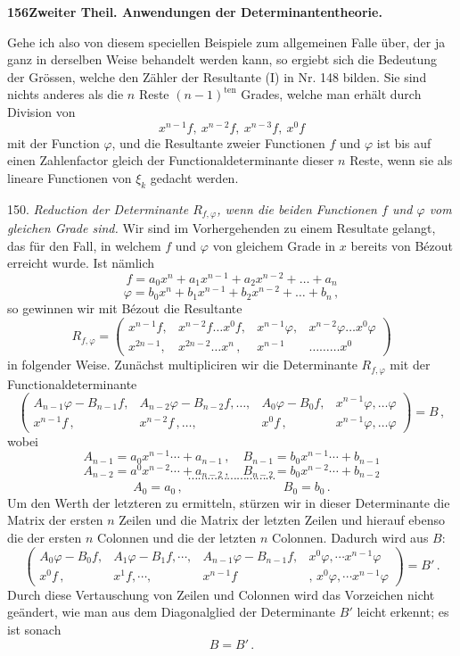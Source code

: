 \documentclass[11pt]{article}
\providecommand{\weberpage}[1]{}
\begin{document}
\weberpage{156}
\textbf{156\quad Zweiter Theil. Anwendungen der Determinantentheorie.}

Gehe ich also von diesem speciellen Beispiele zum allgemeinen Falle über, der ja ganz in derselben Weise behandelt werden kann, so ergiebt sich die Bedeutung der Grössen, welche den Zähler der Resultante (I) in Nr. 148 bilden. Sie sind nichts anderes als die $n$ Reste $(n-1)^{\text{ten}}$ Grades, welche man erhält durch Division von
\[ x^{n-1}f,\ x^{n-2}f,\ x^{n-3}f,\ x^0f \]
mit der Function $\varphi$, und die Resultante zweier Functionen $f$ und $\varphi$ ist bis auf einen Zahlenfactor gleich der Functionaldeterminante dieser $n$ Reste, wenn sie als lineare Functionen von $\xi_k$ gedacht werden.

150. \textit{Reduction der Determinante $R_{f,\varphi}$, wenn die beiden Functionen $f$ und $\varphi$ vom gleichen Grade sind.} Wir sind im Vorhergehenden zu einem Resultate gelangt, das für den Fall, in welchem $f$ und $\varphi$ von gleichem Grade in $x$ bereits von Bézout erreicht wurde. Ist nämlich
\[ f = a_0x^n + a_1x^{n-1} + a_2x^{n-2} + \ldots + a_n \]
\[ \varphi = b_0x^n + b_1x^{n-1} + b_2x^{n-2} + \ldots + b_n\,, \]
so gewinnen wir mit Bézout die Resultante
\[ R_{f,\varphi} = \begin{pmatrix} x^{n-1}f, & x^{n-2}f\ldots x^0f, & x^{n-1}\varphi, & x^{n-2}\varphi\ldots x^0\varphi\\ x^{2n-1}, & x^{2n-2}\ldots x^n\,, & x^{n-1} & \ldots\ldots\ldots x^0 \end{pmatrix} \]
in folgender Weise. Zunächst multipliciren wir die Determinante $R_{f,\varphi}$ mit der Functionaldeterminante
\[ \begin{pmatrix} A_{n-1}\varphi-B_{n-1}f, & A_{n-2}\varphi-B_{n-2}f,\ldots, & A_0\varphi-B_0f, & x^{n-1}\varphi,\ldots\varphi\\ x^{n-1}f\,, & x^{n-2}f\,,\ldots, & x^0f\,, & x^{n-1}\varphi,\ldots\varphi \end{pmatrix} = B\,, \]
wobei
\[ A_{n-1} = a_0x^{n-1}\cdots+a_{n-1}\,,\quad B_{n-1}=b_0x^{n-1}\cdots+b_{n-1} \]
\[ A_{n-2} = a^0x^{n-2}\cdots+a_{n-2}\,,\quad B_{n-2}=b_0x^{n-2}\cdots+b_{n-2} \] %
\[ \cdots\cdots\cdots\cdots\cdots\cdots\cdots\cdots\cdots \]
\[ A_0 = a_0\,,\qquad\qquad\qquad\qquad B_0=b_0\,. \]
Um den Werth der letzteren zu ermitteln, stürzen wir in dieser Determinante die Matrix der ersten $n$ Zeilen und die Matrix der letzten Zeilen und hierauf ebenso die der ersten $n$ Colonnen und die der letzten $n$ Colonnen. Dadurch wird aus $B$:
\[ \begin{pmatrix} A_0\varphi-B_0f, & A_1\varphi-B_1f,\cdots, & A_{n-1}\varphi-B_{n-1}f, & x^0\varphi,\cdots x^{n-1}\varphi\\ x^0f\,, & x^1f,\cdots, & x^{n-1}f & ,\,x^0\varphi,\cdots x^{n-1}\varphi \end{pmatrix} = B'\,. \]
Durch diese Vertauschung von Zeilen und Colonnen wird das Vorzeichen nicht geändert, wie man aus dem Diagonalglied der Determinante $B'$ leicht erkennt; es ist sonach
\[ B = B'\,. \]
\end{document}
